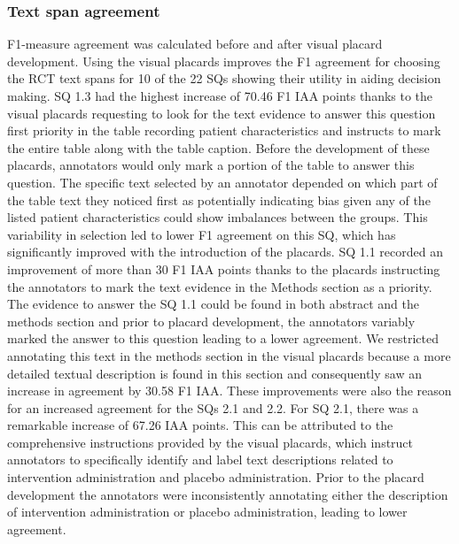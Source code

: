 \documentclass[sn-mathphys,Numbered]{sn-jnl}%
\theoremstyle{thmstyleone}%
\theoremstyle{thmstyletwo}%
\theoremstyle{thmstylethree}%
\begin{document}
\subsubsection{Text span agreement}
\label{disc:f1}
%
F1-measure agreement was calculated before and after visual placard development.
Using the visual placards improves the F1 agreement for choosing the RCT text spans for 10 of the 22 SQs showing their utility in aiding decision making.
SQ 1.3 had the highest increase of 70.46 F1 IAA points thanks to the visual placards requesting to look for the text evidence to answer this question first priority in the table recording patient characteristics and instructs to mark the entire table along with the table caption.
Before the development of these placards, annotators would only mark a portion of the table to answer this question. 
The specific text selected by an annotator depended on which part of the table text they noticed first as potentially indicating bias given any of the listed patient characteristics could show imbalances between the groups.
This variability in selection led to lower F1 agreement on this SQ, which has significantly improved with the introduction of the placards.
SQ 1.1 recorded an improvement of more than 30 F1 IAA points thanks to the placards instructing the annotators to mark the text evidence in the Methods section as a priority. 
The evidence to answer the SQ 1.1 could be found in both abstract and the methods section and prior to placard development, the annotators variably marked the answer to this question leading to a lower agreement.
We restricted annotating this text in the methods section in the visual placards because a more detailed textual description is found in this section and consequently saw an increase in agreement by 30.58 F1 IAA.
These improvements were also the reason for an increased agreement for the SQs 2.1 and 2.2.
For SQ 2.1, there was a remarkable increase of 67.26 IAA points.
This can be attributed to the comprehensive instructions provided by the visual placards, which instruct annotators to specifically identify and label text descriptions related to intervention administration and placebo administration.
Prior to the placard development the annotators were inconsistently annotating either the description of intervention administration or placebo administration, leading to lower agreement.
\end{document}
